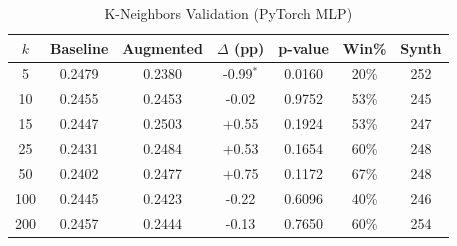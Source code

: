 \begin{table}[htbp]
\centering
\caption{K-Neighbors Validation (PyTorch MLP)}
\label{tab:pytorch_kneighbors}
\begin{tabular}{ccccccc}
\toprule
$k$ & Baseline & Augmented & $\Delta$ (pp) & p-value & Win\% & Synth \\
\midrule
5 & 0.2479 & 0.2380 & -0.99$^{*}$ & 0.0160 & 20\% & 252 \\
10 & 0.2455 & 0.2453 & -0.02 & 0.9752 & 53\% & 245 \\
15 & 0.2447 & 0.2503 & +0.55 & 0.1924 & 53\% & 247 \\
25 & 0.2431 & 0.2484 & +0.53 & 0.1654 & 60\% & 248 \\
50 & 0.2402 & 0.2477 & +0.75 & 0.1172 & 67\% & 248 \\
100 & 0.2445 & 0.2423 & -0.22 & 0.6096 & 40\% & 246 \\
200 & 0.2457 & 0.2444 & -0.13 & 0.7650 & 60\% & 254 \\
\bottomrule
\end{tabular}
\end{table}